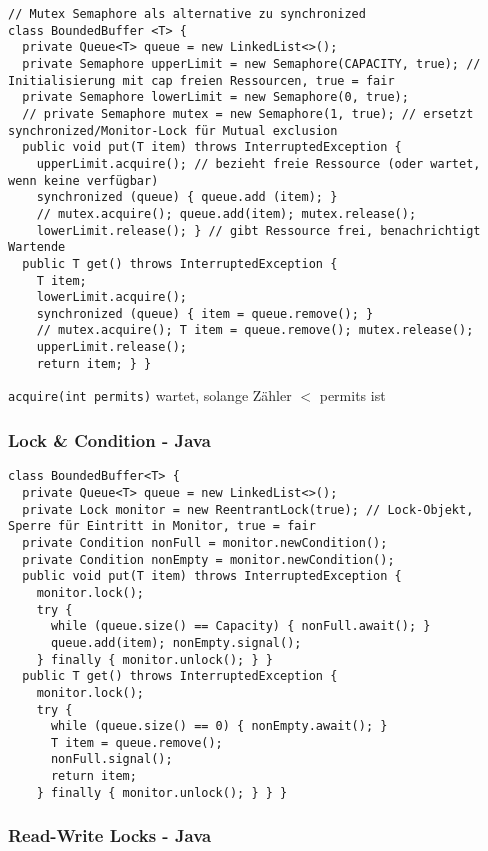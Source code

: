 \begin{lstlisting}
// Mutex Semaphore als alternative zu synchronized
class BoundedBuffer <T> {
  private Queue<T> queue = new LinkedList<>();
  private Semaphore upperLimit = new Semaphore(CAPACITY, true); // Initialisierung mit cap freien Ressourcen, true = fair
  private Semaphore lowerLimit = new Semaphore(0, true);
  // private Semaphore mutex = new Semaphore(1, true); // ersetzt synchronized/Monitor-Lock für Mutual exclusion
  public void put(T item) throws InterruptedException {
    upperLimit.acquire(); // bezieht freie Ressource (oder wartet, wenn keine verfügbar)
    synchronized (queue) { queue.add (item); }
    // mutex.acquire(); queue.add(item); mutex.release();
    lowerLimit.release(); } // gibt Ressource frei, benachrichtigt Wartende
  public T get() throws InterruptedException {
    T item;
    lowerLimit.acquire();
    synchronized (queue) { item = queue.remove(); }
    // mutex.acquire(); T item = queue.remove(); mutex.release();
    upperLimit.release();
    return item; } }
\end{lstlisting}

\lstinline{acquire(int permits)} wartet, solange Zähler $<$ permits ist

\subsubsection{Lock \& Condition - Java}
\begin{lstlisting}
class BoundedBuffer<T> {
  private Queue<T> queue = new LinkedList<>();
  private Lock monitor = new ReentrantLock(true); // Lock-Objekt, Sperre für Eintritt in Monitor, true = fair
  private Condition nonFull = monitor.newCondition();
  private Condition nonEmpty = monitor.newCondition();
  public void put(T item) throws InterruptedException {
    monitor.lock();
    try {
      while (queue.size() == Capacity) { nonFull.await(); }
      queue.add(item); nonEmpty.signal();
    } finally { monitor.unlock(); } }
  public T get() throws InterruptedException {
	monitor.lock();
	try {
	  while (queue.size() == 0) { nonEmpty.await(); }
	  T item = queue.remove();
	  nonFull.signal();
	  return item;
	} finally { monitor.unlock(); } } }
\end{lstlisting}

\subsubsection{Read-Write Locks - Java}

